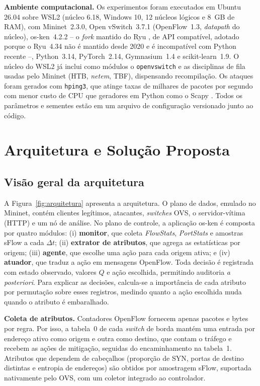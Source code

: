 \documentclass[12pt]{article}
\begin{document}
\textbf{Ambiente computacional.} Os experimentos foram executados em Ubuntu
26.04 sobre WSL2 (núcleo 6.18, Windows 10, 12 núcleos lógicos e 8~GB de RAM),
com Mininet~2.3.0, Open vSwitch~3.7.1 (OpenFlow~1.3, \textit{datapath} do
núcleo), os-ken~4.2.2 -- o \textit{fork} mantido do Ryu \cite{ryu}, de API
compatível, adotado porque o Ryu~4.34 não é mantido desde 2020 e é
incompatível com Python recente --, Python~3.14, PyTorch~2.14, Gymnasium~1.4
\cite{towers2025gymnasium} e scikit-learn~1.9. O núcleo do WSL2 já inclui
como módulos o \texttt{openvswitch} e as disciplinas de fila usadas pelo
Mininet (HTB, \textit{netem}, TBF), dispensando recompilação. Os ataques foram
gerados com \texttt{hping3}, que atinge taxas de milhares de pacotes por segundo
com menor custo de CPU que geradores em Python como o Scapy \cite{scapy}. Todos
os parâmetros e sementes estão em um arquivo de configuração versionado junto
ao código.

\section{Arquitetura e Solução Proposta}\label{sec:arquitetura}

\subsection{Visão geral da arquitetura}

A Figura~\ref{fig:arquitetura} apresenta a arquitetura. O plano de dados,
emulado no Mininet, contém clientes legítimos, atacantes, \textit{switches} OVS,
o servidor-vítima (HTTP) e um nó de análise. No plano de controle, a aplicação
os-ken é composta por quatro módulos: (i) \textbf{monitor}, que coleta
\textit{FlowStats}, \textit{PortStats} e amostras sFlow a cada $\Delta t$; (ii)
\textbf{extrator de atributos}, que agrega as estatísticas por origem; (iii)
\textbf{agente}, que escolhe uma ação para cada origem ativa; e (iv)
\textbf{atuador}, que traduz a ação em mensagens OpenFlow. Toda decisão é
registrada com estado observado, valores $Q$ e ação escolhida, permitindo
auditoria \textit{a posteriori}. Para explicar as decisões, calcula-se a
importância de cada atributo por permutação sobre esses registros, medindo
quanto a ação escolhida muda quando o atributo é embaralhado.

\textbf{Coleta de atributos.} Contadores OpenFlow fornecem apenas pacotes e
bytes por regra. Por isso, a tabela~0 de cada \textit{switch} de borda mantém
uma entrada por endereço ativo como origem e outra como destino, que contam o
tráfego e recebem as ações de mitigação, seguidas do encaminhamento na
tabela~1. Atributos que dependem de cabeçalhos (proporção de SYN, portas de
destino distintas e entropia de endereços) são obtidos por amostragem sFlow,
suportada nativamente pelo OVS, com um coletor integrado ao controlador.
\end{document}
